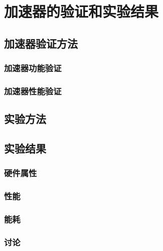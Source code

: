 \chapter{加速器的验证和实验结果}

\section{加速器验证方法}

\subsection{}

\subsection{加速器功能验证}

\subsection{加速器性能验证}

\section{实验方法}


\section{实验结果}

\subsection{硬件属性}

\subsection{性能}

\subsection{能耗}

\subsection{讨论}

